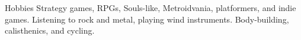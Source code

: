 \begin{rubric}{Hobbies}
	\entry*[Gaming]
		Strategy games, RPGs, Souls-like, Metroidvania, platformers, and indie games.
	\entry*[Music]
		Listening to rock and metal, playing wind instruments.
	\entry*[Sports]
		Body-building, calisthenics, and cycling.
\end{rubric}
